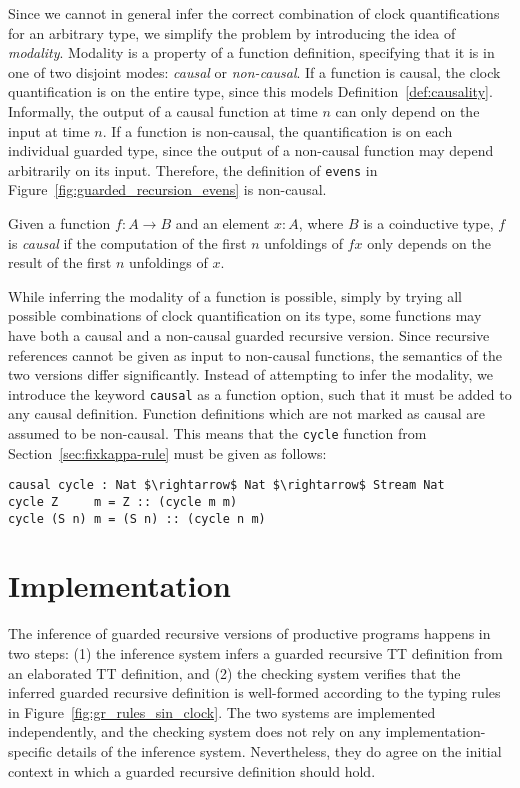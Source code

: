 Since we cannot in general infer the correct combination of clock
quantifications for an arbitrary type, we simplify the problem by introducing
the idea of \emph{modality}. Modality is a property of a function definition,
specifying that it is in one of two disjoint modes: \emph{causal} or
\emph{non-causal}. If a function is causal, the clock quantification is on the
entire type, since this models Definition~\ref{def:causality}. Informally, the
output of a causal function at time $n$ can only depend on the input at time
$n$. If a function is non-causal, the quantification is on each individual
guarded type, since the output of a non-causal function may depend arbitrarily
on its input. Therefore, the definition of \texttt{evens} in
Figure~\ref{fig:guarded_recursion_evens} is non-causal.

\begin{definition}
\label{def:causality}
  Given a function $f : A \to B$ and an element $x : A$, where $B$ is a
  coinductive type, $f$ is \emph{causal} if the computation of the first $n$
  unfoldings of $f x$ only depends on the result of the first $n$ unfoldings of $x$.
\end{definition}

While inferring the modality of a function is possible, simply by trying all
possible combinations of clock quantification on its type, some functions may
have both a causal and a non-causal guarded recursive version. Since recursive
references cannot be given as input to non-causal functions, the semantics of
the two versions differ significantly. Instead of attempting to infer the
modality, we introduce the keyword \texttt{causal} as a function option, such
that it must be added to any causal definition. Function definitions which are
not marked as causal are assumed to be non-causal. This means that the
\texttt{cycle} function from Section~\ref{sec:fixkappa-rule} must be given as
follows:
\begin{lstlisting}[mathescape]
causal cycle : Nat $\rightarrow$ Nat $\rightarrow$ Stream Nat
cycle Z     m = Z :: (cycle m m)
cycle (S n) m = (S n) :: (cycle n m)
\end{lstlisting}


\section{Implementation}
The inference of guarded recursive versions of productive programs happens in
two steps: (1) the inference system infers a guarded recursive TT definition
from an elaborated TT definition, and (2) the checking system verifies that the
inferred guarded recursive definition is well-formed according to the typing
rules in Figure~\ref{fig:gr_rules_sin_clock}. The two systems are implemented
independently, and the checking system does not rely on any
implementation-specific details of the inference system. Nevertheless, they do
agree on the initial context in which a guarded recursive definition should
hold.

